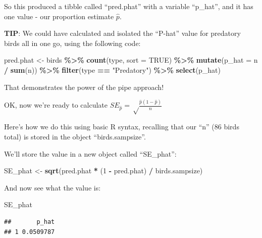 \documentclass[
]{book}
\newenvironment{Shaded}{\begin{snugshade}}{\end{snugshade}}
\newcommand{\AttributeTok}[1]{\textcolor[rgb]{0.13,0.29,0.53}{#1}}
\newcommand{\ConstantTok}[1]{\textcolor[rgb]{0.56,0.35,0.01}{#1}}
\newcommand{\DecValTok}[1]{\textcolor[rgb]{0.00,0.00,0.81}{#1}}
\newcommand{\FunctionTok}[1]{\textcolor[rgb]{0.13,0.29,0.53}{\textbf{#1}}}
\newcommand{\NormalTok}[1]{#1}
\newcommand{\OtherTok}[1]{\textcolor[rgb]{0.56,0.35,0.01}{#1}}
\newcommand{\SpecialCharTok}[1]{\textcolor[rgb]{0.81,0.36,0.00}{\textbf{#1}}}
\newcommand{\StringTok}[1]{\textcolor[rgb]{0.31,0.60,0.02}{#1}}
\begin{document}
So this produced a tibble called ``pred.phat'' with a variable ``p\_hat'', and it has one value - our proportion estimate \(\hat{p}\).

\textbf{TIP}: We could have calculated and isolated the ``P-hat'' value for predatory birds all in one go, using the following code:

\begin{Shaded}
\begin{Highlighting}[]
\NormalTok{pred.phat }\OtherTok{\textless{}{-}}\NormalTok{ birds }\SpecialCharTok{\%\textgreater{}\%}
  \FunctionTok{count}\NormalTok{(type, }\AttributeTok{sort =} \ConstantTok{TRUE}\NormalTok{) }\SpecialCharTok{\%\textgreater{}\%} 
  \FunctionTok{mutate}\NormalTok{(}\AttributeTok{p\_hat =}\NormalTok{ n }\SpecialCharTok{/} \FunctionTok{sum}\NormalTok{(n)) }\SpecialCharTok{\%\textgreater{}\%}
  \FunctionTok{filter}\NormalTok{(type }\SpecialCharTok{==} \StringTok{"Predatory"}\NormalTok{) }\SpecialCharTok{\%\textgreater{}\%}
  \FunctionTok{select}\NormalTok{(p\_hat)}
\end{Highlighting}
\end{Shaded}

That demonstrates the power of the pipe approach!

OK, now we're ready to calculate \(SE_\hat{p} = \sqrt\frac{\hat{p}(1-\hat{p})}{n}\)

Here's how we do this using basic R syntax, recalling that our ``n'' (86 birds total) is stored in the object ``birds.sampsize''.

We'll store the value in a new object called ``SE\_phat'':

\begin{Shaded}
\begin{Highlighting}[]
\NormalTok{SE\_phat }\OtherTok{\textless{}{-}} \FunctionTok{sqrt}\NormalTok{(pred.phat }\SpecialCharTok{*}\NormalTok{ (}\DecValTok{1} \SpecialCharTok{{-}}\NormalTok{ pred.phat) }\SpecialCharTok{/}\NormalTok{ birds.sampsize)}
\end{Highlighting}
\end{Shaded}

And now see what the value is:

\begin{Shaded}
\begin{Highlighting}[]
\NormalTok{SE\_phat}
\end{Highlighting}
\end{Shaded}

\begin{verbatim}
##       p_hat
## 1 0.0509787
\end{verbatim}
\end{document}
